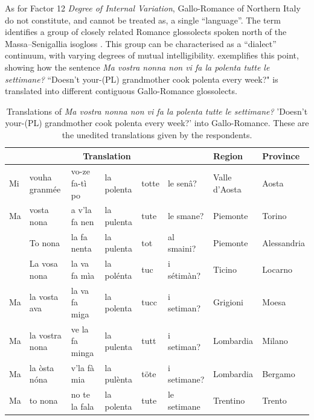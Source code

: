 \documentclass[a4paper,11pt]{article}
\begin{document}
As for Factor 12 \textit{Degree of Internal Variation}, Gallo-Romance of Northern Italy do not constitute, and cannot be treated as, a single ``language''. The term identifies a group of closely related Romance glossolects spoken north of the Massa--Senigallia isogloss \citep{maidenandparry1997, tamburelli2018revisiting, beninca2016}. This group can be characterised as a ``dialect'' continuum, with varying degrees of mutual intelligibility.  exemplifies this point, showing how the sentence \textit{Ma vostra nonna non vi fa la polenta tutte le settimane?} ``Doesn’t your-(PL) grandmother cook polenta every week?" is translated into different contiguous Gallo-Romance glossolects.

\begin{table}
\caption{Translations of \textit{Ma vostra nonna non vi fa la polenta tutte le settimane?} 'Doesn’t your-(PL) grandmother cook polenta every week?' into Gallo-Romance. These are the unedited translations given by the respondents.}\label{tab:translations}
\footnotesize
\begin{tabular}{llllllll}
\toprule
\multicolumn{6}{c}{\textbf{Translation}} & \textbf{Region} & \textbf{Province} \\\midrule
Mi & vouha granmée & vo-ze fa-tì po & la polenta & totte  & le senâ?      & Valle d'Aosta                & Aosta              \\
Ma &vosta nona & a v'la fa nen & la pulenta & tute & le smane?          & Piemonte                     & Torino             \\
& To nona & la fa nenta & la pulenta & tot & al smaini?                  & Piemonte                     & Alessandria        \\
& La vosa nona & la va fa mìa & la polénta&  tuc & i sétimàn?            & Ticino                       & Locarno            \\
Ma & la vosta ava & la va fa miga & la polenta & tucc & i setiman?       & Grigioni                     & Moesa              \\
Ma & la vostra nona & ve la fa minga & la pulenta & tutt & i setiman?    & Lombardia                    & Milano             \\
Ma & la òsta nóna & v'la fà mia & la pulènta & töte & i setimane?        & Lombardia                    & Bergamo            \\
Ma & to nona & no te la fala & la polenta & tute & le setimane           & Trentino & Trento             \\

\end{tabular}
\end{table}
\end{document}
